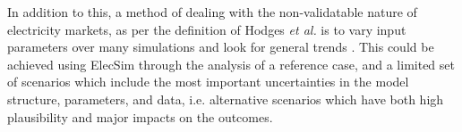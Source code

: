 In addition to this, a method of dealing with the non-validatable nature of electricity markets, as per the definition of Hodges \textit{et al.} is to vary input parameters over many simulations and look for general trends \cite{Hodges}. This could be achieved using ElecSim through the analysis of a reference case, and a limited set of scenarios which include the most important uncertainties in the model structure, parameters, and data, i.e. alternative scenarios which have both high plausibility and major impacts on the outcomes.





